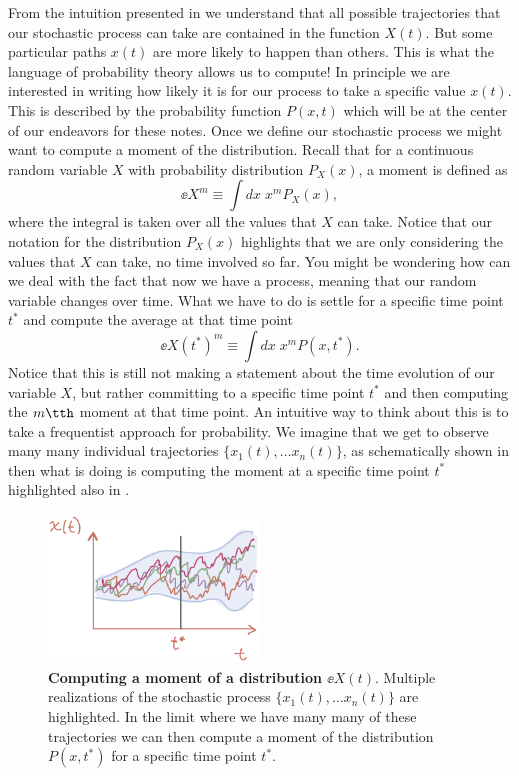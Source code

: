 From the intuition presented in  we understand that all possible
trajectories that our stochastic process can take are contained in the function
$X(t)$. But some particular paths $x(t)$ are more likely to happen than others.
This is what the language of probability theory allows us to compute! In
principle we are interested in writing how likely it is for our process to take
a specific value $x(t)$. This is described by the probability function $P(x, t)$
which will be at the center of our endeavors for these notes. Once we define our
stochastic process we might want to compute a moment of the distribution. Recall
that for a continuous random variable $X$ with probability distribution
$P_X(x)$, a moment is defined as
\begin{equation}
  \ee{X^m} \equiv \int dx \; x^m P_X(x),
\end{equation}
where the integral is taken over all the values that $X$ can take. Notice that
our notation for the distribution $P_X(x)$ highlights that we are only
considering the values that $X$ can take, no time involved so far. You might be
wondering how can we deal with the fact that now we have a process, meaning that
our random variable changes over time. What we have to do is settle for a
specific time point $t^*$ and compute the average at that time point
\begin{equation}
  \ee{X(t^*)^m} \equiv \int dx \; x^m P(x, t^*).
  \label{eq_process_moment}
\end{equation}
Notice that this is still not making a statement about the time evolution of our
variable $X$, but rather committing to a specific time point $t^*$ and then
computing the $m\tth$ moment at that time point. An intuitive way to think about
this is to take a frequentist approach for probability. We imagine that we get
to observe many many individual trajectories $\{x_1(t), \ldots x_n(t)\}$, as
schematically shown in  then what  is
doing is computing the moment at a specific time point $t^*$ highlighted also
in .

\begin{figure}[h!]
	\centering \includegraphics[width=0.5\textwidth]
  {./fig/chapter_prob/01_00002.jpeg}
	\caption{\textbf{Computing a moment of a distribution $\ee{X(t)}$}. Multiple
  realizations of the stochastic process $\{x_1(t), \ldots x_n(t)\}$ are
  highlighted. In the limit where we have many many of these trajectories we
  can then compute a moment of the distribution $P(x, t^*)$ for a specific time
  point $t^*$. }
  \label{fig01_00002}
\end{figure}

